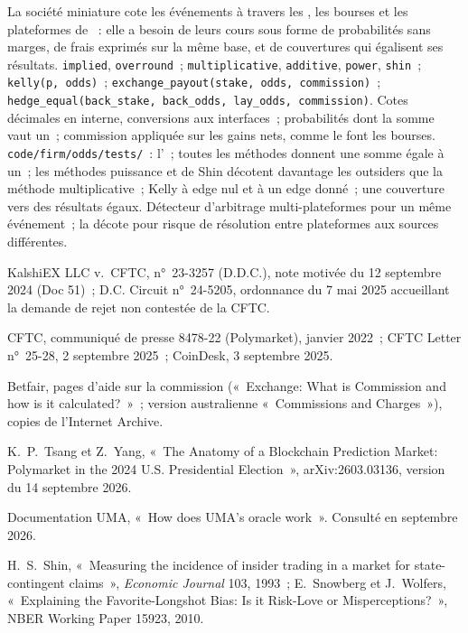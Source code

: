 \begin{build}
 La société miniature cote les événements à travers les , les bourses et les plateformes de ~: elle a besoin de leurs cours sous forme de probabilités sans
marges, de frais exprimés sur la même base, et de couvertures qui égalisent ses résultats.
 \texttt{implied}, \texttt{overround}~; \texttt{multiplicative}, \texttt{additive}, \texttt{power}, \texttt{shin}~; \texttt{kelly(p, odds)}~;
\texttt{exchange\_payout(stake, odds, commission)}~; \texttt{hedge\_equal(back\_stake, back\_odds, lay\_odds, commission)}.
 Cotes décimales en interne, conversions aux interfaces~; probabilités dont la somme vaut un~; commission appliquée sur les gains nets, comme le font les bourses.
 \texttt{code/firm/odds/tests/}~: l'~; toutes les méthodes donnent une somme égale à un~; les méthodes puissance et de Shin décotent davantage les outsiders que la
méthode multiplicative~; Kelly à edge nul et à un edge donné~; une couverture vers des résultats égaux.
 Détecteur d'arbitrage multi-plateformes pour un même événement~; la décote pour risque de résolution entre plateformes aux sources différentes.
\end{build}

\begin{omsources}
\item KalshiEX LLC v.\ CFTC, n°~23-3257 (D.D.C.), note motivée du 12 septembre 2024 (Doc 51)~; D.C. Circuit n°~24-5205, ordonnance du 7 mai 2025
accueillant la demande de rejet non contestée de la CFTC.
\item CFTC, communiqué de presse 8478-22 (Polymarket), janvier 2022~; CFTC Letter n°~25-28, 2 septembre 2025~; CoinDesk, 3 septembre 2025.
\item Betfair, pages d'aide sur la commission («~Exchange: What is Commission and how is it calculated?~»~; version australienne «~Commissions and Charges~»),
copies de l'Internet Archive.
\item K.~P.~Tsang et Z.~Yang, «~The Anatomy of a Blockchain Prediction Market: Polymarket in the 2024 U.S. Presidential Election~»,
arXiv:2603.03136, version du 14 septembre 2026.
\item Documentation UMA, «~How does UMA's oracle work~». Consulté en septembre 2026.
\item H.~S.~Shin, «~Measuring the incidence of insider trading in a market for state-contingent claims~», \emph{Economic Journal} 103, 1993~; E.~Snowberg
et J.~Wolfers, «~Explaining the Favorite-Longshot Bias: Is it Risk-Love or Misperceptions?~», NBER Working Paper 15923, 2010.
\end{omsources}

